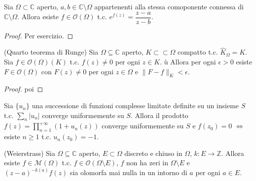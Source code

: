 \begin{lm}
  Sia $\Omega \subset \mathbb{C}$ aperto, $a, b \in \mathbb{C}\setminus\Omega$ appartenenti alla stessa comoponente connessa di $\mathbb{C}\setminus\Omega$. Allora esiste $f \in \mathcal{O}(\Omega)$ t.c. $e^{f(z)}=\dfrac{z-a}{z-b}$.
\end{lm}

\begin{proof}
  Per esercizio.
\end{proof}

\begin{thm}
  (Quarto teorema di Runge) Sia $\Omega \subseteq \mathbb{C}$ aperto, $K\subset\subset\Omega$ compatto t.c. $\widehat{K}_{\Omega}=K$. Sia $f \in \mathcal{O}(\Omega)(K)$ t.c. $f(z) \not=0$ per ogni $z \in K$. ù
  Allora per ogni $\epsilon>0$ esiste $F \in \mathcal{O}(\Omega)$ con $F(z) \not=0$ per ogni $z \in \Omega$ e $\|F-f\|_K<\epsilon$.
\end{thm}

\begin{proof}
  poi
\end{proof}

\begin{exc}
  Sia $\{u_n\}$ una successione di funzioni complesse limitate definite su un insieme $S$ t.c. $\displaystyle \sum_{n} |u_n|$ converge uniformemente su $S$. Allora il prodotto $\displaystyle f(z)=\prod_{n=1}^{+\infty} (1+u_n(z))$ converge uniformemente su $S$ e $f(z_0)=0$ $\iff$ esiste $n \ge 1$ t.c. $u_n(z_0)=-1$.
\end{exc}

\begin{thm}
  (Weierstrass) Sia $\Omega \subseteq \mathbb{C}$ aperto, $E \subset \Omega$ discreto e chiuso in $\Omega$, $k:E \longrightarrow \mathbb{Z}$. Allora esiste $f \in \mathcal{M}(\Omega)$ t.c. $f \in \mathcal{O}(\Omega \setminus E)$, $f$ non ha zeri in $\Omega \setminus E$ e $(z-a)^{-k(a)}f(z)$ sia olomorfa mai nulla in un intorno di $a$ per ogni $a \in E$.
\end{thm}

